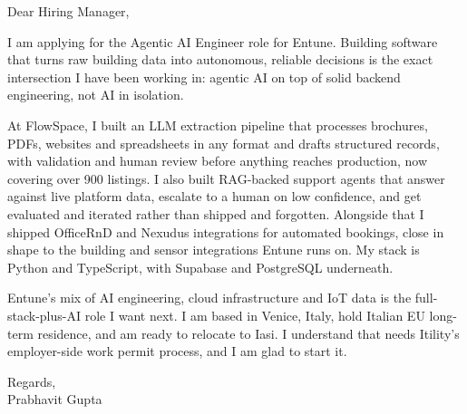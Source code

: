 \documentclass[a4paper,11pt]{article}
\begin{document}
Dear Hiring Manager,

I am applying for the Agentic AI Engineer role for Entune. Building software that turns raw building data into autonomous, reliable decisions is the exact intersection I have been working in: agentic AI on top of solid backend engineering, not AI in isolation.

At FlowSpace, I built an LLM extraction pipeline that processes brochures, PDFs, websites and spreadsheets in any format and drafts structured records, with validation and human review before anything reaches production, now covering over 900 listings. I also built RAG-backed support agents that answer against live platform data, escalate to a human on low confidence, and get evaluated and iterated rather than shipped and forgotten. Alongside that I shipped OfficeRnD and Nexudus integrations for automated bookings, close in shape to the building and sensor integrations Entune runs on. My stack is Python and TypeScript, with Supabase and PostgreSQL underneath.

Entune's mix of AI engineering, cloud infrastructure and IoT data is the full-stack-plus-AI role I want next. I am based in Venice, Italy, hold Italian EU long-term residence, and am ready to relocate to Iasi. I understand that needs Itility's employer-side work permit process, and I am glad to start it.

Regards,\\
Prabhavit Gupta
\end{document}
